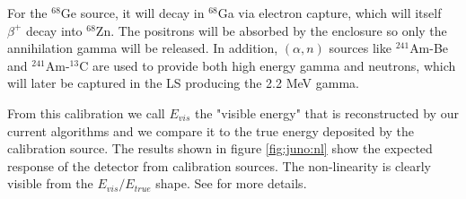 For the $^{68}$Ge source, it will decay in $^{68}$Ga via electron capture, which will itself $\beta^+$ decay into $^{68}$Zn. The positrons will be absorbed by the enclosure so only the annihilation gamma will be released. In addition, $(\alpha, n)$ sources like $^{241}$Am-Be and $^{241}$Am-$^{13}$C are used to provide both high energy gamma and neutrons, which will later be captured in the LS producing the 2.2 MeV gamma.

From this calibration we call $E_{vis}$ the "visible energy" that is reconstructed by our current algorithms and we compare it to the true energy deposited by the calibration source. The results shown in figure \ref{fig:juno:nl} show the expected response of the detector from calibration sources. The non-linearity is clearly visible from the $E_{vis} / E_{true}$ shape. See \cite{juno_collaboration_calibration_2021} for more details.

